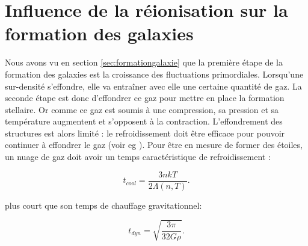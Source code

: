 

\section{Influence de la réionisation sur la formation des galaxies}
\label{sec:refroidissement}

Nous avons vu en section \ref{sec:formationgalaxie} que la première étape de la formation des galaxies est la croissance des fluctuations primordiales.
Lorsqu'une sur-densité s’effondre, elle va entraîner avec elle une certaine quantité de gaz.
La seconde étape est donc d’effondrer ce gaz pour mettre en place la formation stellaire.
Or comme ce gaz est soumis à une compression, sa pression et sa température augmentent et s'opposent à la contraction.
L'effondrement des structures est alors limité : le refroidissement doit être efficace pour pouvoir continuer à effondrer le gaz (voir eg \cite{2004ARA&A..42...79B}).
Pour être en mesure de former des étoiles, un nuage de gaz doit avoir un temps caractéristique de refroidissement :

\begin{equation}
t_{cool} = \frac{3 nkT}{2 \Lambda(n,T)}.
\end{equation}

plus court que son temps de chauffage gravitationnel:

\begin{equation}
t_{dyn} =\sqrt{\frac{3 \pi}{32 G \rho}}.
\end{equation}




